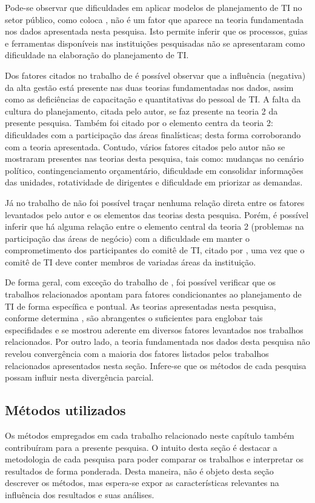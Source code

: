 Pode-se observar que dificuldades em aplicar modelos de planejamento de TI no setor público, como coloca , não é um fator que aparece na teoria fundamentada nos dados apresentada nesta pesquisa. Isto permite inferir que os processos, guias e ferramentas disponíveis nas instituições pesquisadas não se apresentaram como dificuldade na elaboração do planejamento de TI.

Dos fatores citados no trabalho de  é possível observar que a influência (negativa) da alta gestão está presente nas duas teorias fundamentadas nos dados, assim como as deficiências de capacitação e quantitativas do pessoal de TI. A falta da cultura do planejamento, citada pelo autor, se faz presente na teoria 2 da presente pesquisa. Também foi citado por  o elemento centra da teoria 2: dificuldades com a participação das áreas finalísticas; desta forma corroborando com a teoria apresentada. Contudo, vários fatores citados pelo autor não se mostraram presentes nas teorias desta pesquisa, tais como: mudanças no cenário político, contingenciamento orçamentário, dificuldade em consolidar informações das unidades, rotatividade de dirigentes e dificuldade em priorizar as demandas.

Já no trabalho de  não foi possível traçar nenhuma relação direta entre os fatores levantados pelo autor e os elementos das teorias desta pesquisa. Porém, é possível inferir que há alguma relação entre o elemento central da teoria 2 (problemas na participação das áreas de negócio) com a dificuldade em manter o comprometimento dos participantes do comitê de TI, citado por , uma vez que o comitê de TI deve conter membros de variadas áreas da instituição.

De forma geral, com exceção do trabalho de , foi possível verificar que os trabalhos relacionados apontam para fatores condicionantes ao planejamento de TI de forma específica e pontual. As teorias apresentadas nesta pesquisa, conforme determina , são abrangentes o suficientes para englobar tais especifidades e se mostrou aderente em diversos fatores levantados nos trabalhos relacionados. Por outro lado, a teoria fundamentada nos dados desta pesquisa não revelou convergência com a maioria dos fatores listados pelos trabalhos relacionados apresentados nesta seção. Infere-se que os métodos de cada pesquisa possam influir nesta divergência parcial.

\subsection{Métodos utilizados}
Os métodos empregados em cada trabalho relacionado neste capítulo também contribuíram para a presente pesquisa. O intuito desta seção é destacar a metodologia de cada pesquisa para poder comparar os trabalhos e interpretar os resultados de forma ponderada. Desta maneira, não é objeto desta seção descrever os métodos, mas espera-se expor as características relevantes na influência dos resultados e suas análises.

